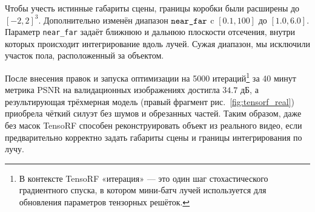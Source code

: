 Чтобы учесть истинные габариты сцены, границы коробки были
расширены до $[-2,2]^3$. Дополнительно изменён диапазон
$\verb|near_far|$ c $[0.1,100]$ до $[1.0,6.0]$.
Параметр \texttt{near\_far} задаёт ближнюю и дальнюю плоскости
отсечения, внутри которых происходит интегрирование вдоль лучей.
Сужая диапазон, мы исключили участок пола, расположенный
за объектом.

После внесения правок и запуска оптимизации на 5000 итераций\footnote{В
контексте TensoRF «итерация» — это один шаг стохастического градиентного спуска,
в котором мини‑батч лучей используется для обновления параметров тензорных
решёток.} за 40 минут метрика PSNR на валидационных изображениях достигла $34.7$ дБ, а
результирующая трёхмерная модель (правый фрагмент рис.~\ref{fig:tensorf_real})
приобрела чёткий силуэт без шумов и обрезанных частей. Таким образом, даже без
масок TensoRF способен реконструировать объект из реального видео, если
предварительно корректно задать габариты сцены и границы интегрирования по лучу.
